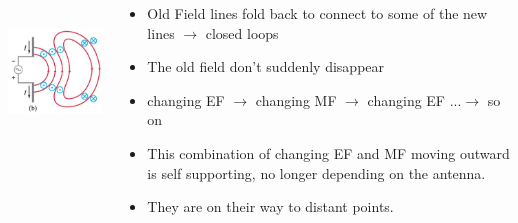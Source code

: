 \documentclass[]{beamer}
\begin{document}






\begin{frame}


   \begin{columns}[c]
   \column{2in}  %
  
  \begin{center}
  \includegraphics[height=1.7in]{images5/antenna3.jpg}
\end{center}


   \column{2.7in}


\begin{itemize}
\pause
\item Old Field lines fold back to connect to some of the new lines $\rightarrow$ closed loops
\pause
 \item The old field don't suddenly disappear
\pause
 \item changing EF $\rightarrow$ changing MF $\rightarrow$ changing EF ...$\rightarrow$ so on
\pause
 \item This combination of  changing EF and MF moving outward is self supporting, no longer depending on the antenna. 
\pause
 \item They are on their way to distant points.

\end{itemize}

   \end{columns}


  \end{frame}

\end{document}
